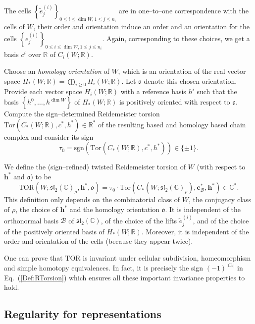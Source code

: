 \documentclass[a4paper]{amsart}
\theoremstyle{plain}
\theoremstyle{definition}
\theoremstyle{remark}
\newcommand{\CC}{{\mathbb C}}
\newcommand{\IR}{{\mathbb R}}
\newcommand{\sll}{\mathfrak{sl}_2(\CC)}
\begin{document}
The cells $\left\{ \tilde{e}^{(i)}_j \right\}^{}_{0 \leqslant i \leqslant \dim W, 1 \leqslant j \leqslant n_i}$ are in one--to--one correspondence with the cells of $W$, their order and orientation induce an order and an orientation for the cells $\left\{ e^{(i)}_j \right\}^{}_{0 \leqslant i \leqslant \dim W, 1 \leqslant j \leqslant n_i}$. Again, corresponding to these choices, we get a basis $c^i$ over $\IR$ of $C_i(W; \IR)$. 

Choose an \emph{homology orientation} of $W$, which is an orientation of the real vector space $H_*(W; \IR) = \bigoplus_{i\geqslant 0} H_i(W; \IR)$. Let $\mathfrak{o}$ denote this chosen orientation. Provide each vector space $H_i(W; \IR)$ with a reference basis $h^i$ such that the basis $\left\{ {h^0, \ldots, h^{\dim W}} \right\}$ of $H_*(W; \IR)$ is {positively oriented} with respect to $\mathfrak{o}$. Compute the sign--determined Reidemeister torsion $\mathrm{Tor}(C_*(W; \IR), c^*, h^{*}) \in \IR^*$ of the resulting based and homology based chain complex and consider its sign $$\tau_0 = \mathrm{sgn}\left(\mathrm{Tor}(C_*(W; \IR), c^*, h^{*})\right) \in \{\pm 1\}.$$  

We define the (sign--refined)  twisted  Reidemeister torsion of $W$ {(with respect to $\mathbf{h}^{*}$ and $\mathfrak{o}$)} to be
\begin{equation}\label{EQ:TorsionRaff}
\mathrm{TOR}(W; \sll_\rho, \mathbf{h}^{*}, \mathfrak{o}) = \tau_0 \cdot \mathrm{Tor}(C_*(W; \sll_\rho), \mathbf{c}^*_{\mathcal{B}}, \mathbf{h}^{*}) \in \mathbb{C}^*.
\end{equation}
This definition only depends on the combinatorial class of $W$, the conjugacy class of $\rho$, the choice of $\mathbf{h}^{*}$ and the {homology} orientation $\mathfrak{o}$. It is independent of the orthonormal basis $\mathcal{B}$ of $\sll$, of the choice of the lifts $\tilde{e}^{(i)}_j$, and of the choice of the positively oriented basis of $H_*(W; \IR)$. Moreover, it is independent of the order and orientation of the cells (because they appear twice). 

One can prove that $\mathrm{TOR}$ is invariant under cellular subdivision, homeomorphism and simple homotopy equivalences. In fact, it is precisely the sign $(-1)^{|C_*|}$ in Eq.~(\ref{Def:RTorsion}) which ensures all these important invariance properties to hold.


\subsection{Regularity for representations}
\end{document}
